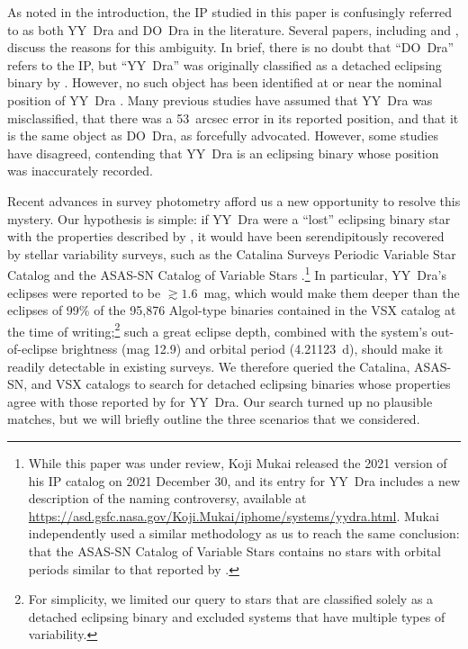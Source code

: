 \documentclass[twocolumn]{aastex63}
\begin{document}
As noted in the introduction, the IP studied in this paper is confusingly referred to as both YY~Dra and DO~Dra in the literature. Several papers, including \citet{patterson87} and \citet{virnina}, discuss the reasons for this ambiguity. In brief, there is no doubt that ``DO~Dra'' refers to the IP, but ``YY~Dra'' was originally classified as a detached eclipsing binary by \citet{tsesevich}. However, no such object has been identified at or near the nominal position of YY~Dra \citep{patterson87, virnina}. Many previous studies have assumed that YY~Dra was misclassified, that there was a 53~arcsec error in its reported position, and that it is the same object as DO~Dra, as \citet{patterson87} forcefully advocated. However, some studies \citep[e.g.,][]{andronov08} have disagreed, contending that YY~Dra is an eclipsing binary whose position was inaccurately recorded. 

Recent advances in survey photometry afford us a new opportunity to resolve this mystery. Our hypothesis is simple: if YY~Dra were a ``lost'' eclipsing binary star with the properties described by \citet{tsesevich}, it would have been serendipitously recovered by stellar variability surveys, such as the Catalina Surveys Periodic Variable Star Catalog \citep{drake14} and the ASAS-SN Catalog of Variable Stars \citep{jayasinghe18, jayasinghe19}.\footnote{While this paper was under review, Koji Mukai released the 2021 version of his IP catalog on 2021 December 30, and its entry for YY~Dra includes a new description of the naming controversy, available at \url{https://asd.gsfc.nasa.gov/Koji.Mukai/iphome/systems/yydra.html}. Mukai independently used a similar methodology as us to reach the same conclusion: that the ASAS-SN Catalog of Variable Stars contains no stars with orbital periods similar to that reported by \citet{tsesevich}.} In particular, YY~Dra's eclipses were reported to be $\gtrsim1.6$~mag, which would make them deeper than the eclipses of 99\% of the 95,876 Algol-type binaries contained in the VSX catalog at the time of writing;\footnote{For simplicity, we limited our query to stars that are classified solely as a detached eclipsing binary and excluded systems that have multiple types of variability.} such a great eclipse depth, combined with the system's out-of-eclipse brightness (mag 12.9) and orbital period (4.21123~d), should make it readily detectable in existing surveys. We therefore queried the Catalina, ASAS-SN, and VSX catalogs to search for detached eclipsing binaries whose properties agree with those reported by \citet{tsesevich} for YY~Dra. Our search turned up no plausible matches, but we will briefly outline the three scenarios that we considered.
\end{document}
